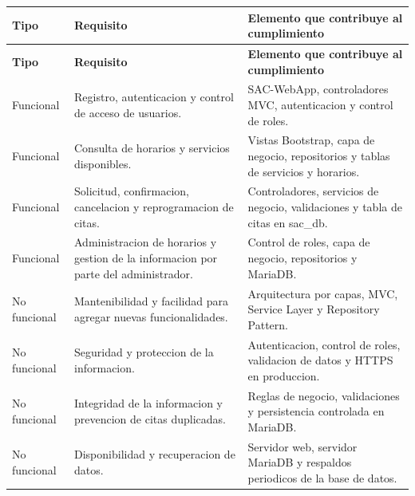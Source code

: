 \documentclass[12pt,letterpaper]{article}
\begin{document}
\begin{center}
\small
\setlength{\tabcolsep}{5pt}
\renewcommand{\arraystretch}{1.20}

\begin{longtable}{|Y{2.4cm}|Y{6.3cm}|Y{6.1cm}|}
\hline
\textbf{Tipo} & \textbf{Requisito} & \textbf{Elemento que contribuye al cumplimiento} \\
\hline
\endfirsthead
\hline
\textbf{Tipo} & \textbf{Requisito} & \textbf{Elemento que contribuye al cumplimiento} \\
\hline
\endhead
\hline
\endfoot
\hline
\endlastfoot

Funcional & Registro, autenticacion y control de acceso de usuarios. & SAC-WebApp, controladores MVC, autenticacion y control de roles. \\
\hline

Funcional & Consulta de horarios y servicios disponibles. & Vistas Bootstrap, capa de negocio, repositorios y tablas de servicios y horarios. \\
\hline

Funcional & Solicitud, confirmacion, cancelacion y reprogramacion de citas. & Controladores, servicios de negocio, validaciones y tabla de citas en sac\_db. \\
\hline

Funcional & Administracion de horarios y gestion de la informacion por parte del administrador. & Control de roles, capa de negocio, repositorios y MariaDB. \\
\hline

No funcional & Mantenibilidad y facilidad para agregar nuevas funcionalidades. & Arquitectura por capas, MVC, Service Layer y Repository Pattern. \\
\hline

No funcional & Seguridad y proteccion de la informacion. & Autenticacion, control de roles, validacion de datos y HTTPS en produccion. \\
\hline

No funcional & Integridad de la informacion y prevencion de citas duplicadas. & Reglas de negocio, validaciones y persistencia controlada en MariaDB. \\
\hline

No funcional & Disponibilidad y recuperacion de datos. & Servidor web, servidor MariaDB y respaldos periodicos de la base de datos. \\
\hline
\end{longtable}
\end{center}
\end{document}
